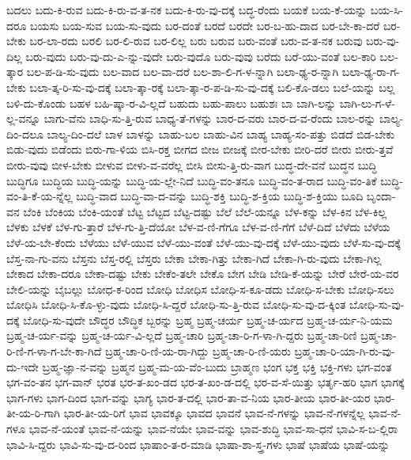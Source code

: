 {ಬದಲು
ಬದು-ಕಿ-ರುವ
ಬದು-ಕಿ-ರು-ವ-ತ-ನಕ
ಬದು-ಕಿ-ರು-ವು-ದಕ್ಕೆ
ಬದ್ಧ-ರೆಂದು
ಬಯಕೆ
ಬಯ-ಕೆ-ಯನ್ನು
ಬಯ-ಸಿ-ದರೂ
ಬಯಸು
ಬಯ-ಸುವ
ಬಯ-ಸು-ವುದು
ಬರ-ದಂತೆ
ಬರದೆ
ಬರದೇ
ಬರ-ಬ-ಹು-ದಾದ
ಬರ-ಬೇ-ಕಾ-ದರೆ
ಬರ-ಬೇಕು
ಬರ-ಲಾ-ರದು
ಬರಲಿ
ಬರ-ಲಿ-ರುವ
ಬರ-ಲಿಲ್ಲ
ಬರು
ಬರುವ
ಬರು-ವಂತೆ
ಬರು-ವ-ತ-ನಕ
ಬರುವು
ಬರು-ವು-ದಿಲ್ಲ
ಬರು-ವುದು
ಬರು-ವು-ದು-ಎ-ನ್ನು-ವುದೇ
ಬರು-ವುದೊ
ಬರು-ವುವು
ಬರೆದು
ಬರೆ-ಯು-ವಂತೆ
ಬಲ-ಕಾರಿ
ಬಲ-ತ್ಕಾರ
ಬಲ-ಪ-ಡಿ-ಸು-ವುದು
ಬಲ-ವಾದ
ಬಲ-ವಾ-ದರೆ
ಬಲ-ಶಾ-ಲಿ-ಗ-ಳ-ನ್ನಾಗಿ
ಬಲಾ-ಢ್ಯ-ರ-ನ್ನಾಗಿ
ಬಲಾ-ಢ್ಯ-ರಾ-ಗ-ಬೇಕು
ಬಲಾ-ತ್ಕ-ರಿ-ಸು-ವು-ದಕ್ಕೆ
ಬಲಾ-ತ್ಕಾ-ರಕ್ಕೆ
ಬಲಾ-ತ್ಕಾ-ರ-ಪ-ಡಿ-ಸು-ವು-ದಕ್ಕೆ
ಬಲಿ-ಕೊ-ಡಲು
ಬಲೆ-ಯನ್ನು
ಬಲ್ಲ
ಬಳಿ-ದು-ಕೊಂಡು
ಬಹಳ
ಬಹಿ-ಷ್ಕಾ-ರ-ವಿ-ಲ್ಲದೆ
ಬಹುದು
ಬಹು-ಪಾಲು
ಬಹುಶಃ
ಬಾ
ಬಾಗಿ-ಲನ್ನು
ಬಾಗಿ-ಲು-ಗ-ಳೆ-ಲ್ಲ-ವನ್ನೂ
ಬಾಗು-ವೆನು
ಬಾಧಿ-ಸು-ತ್ತಿ-ರುವ
ಬಾಧ್ಯ-ತೆ-ಗಳನ್ನು
ಬಾರ-ದ-ವರು
ಬಾರ-ದ-ವ-ರೆಂದು
ಬಾಲ-ರನ್ನು
ಬಾಲ್ಯ-ದಿಂ-ದಲೂ
ಬಾಲ್ಯ-ದಿಂ-ದಲೆ
ಬಾಳ
ಬಾಳನ್ನು
ಬಾಹು-ಬಲ
ಬಾಹು-ವಿನ
ಬಾಹ್ಯ
ಬಾಹ್ಯ-ಸಂ-ಪತ್ತು
ಬಿಡದೆ
ಬಿಡ-ಬೇಕು
ಬಿಡು-ವುದು
ಬಿಡೆಂದು
ಬಿರು-ಗಾ-ಳಿಯ
ಬಿಸಿ-ರಕ್ತ
ಬೀಗದ
ಬೀಜ
ಬೀಜಕ್ಕೆ
ಬೀರ-ಬೇಕು
ಬೀರಿ-ದರೆ
ಬೀರು
ಬೀರು-ತ್ತವೆ
ಬೀರು-ವುವು
ಬೀಳ-ಬೇಕು
ಬೀಳುವ
ಬೀಳು-ವ-ವರೆಲ್ಲ
ಬೀಸಿ
ಬೀಸು-ತ್ತಿ-ರು-ವಾಗ
ಬುದ್ಧ-ದೇ-ವನೆ
ಬುದ್ಧನ
ಬುದ್ಧಿ
ಬುದ್ಧಿಗೂ
ಬುದ್ಧಿಯ
ಬುದ್ಧಿ-ಯನ್ನು
ಬುದ್ಧಿ-ಯ-ಲ್ಲೇ-ನಿದೆ
ಬುದ್ಧಿ-ವಂ-ತನೂ
ಬುದ್ಧಿ-ವಂ-ತ-ರಾದ
ಬುದ್ಧಿ-ವಂ-ತಿಕೆ
ಬುದ್ಧಿ-ವಂ-ತಿ-ಕೆ-ಯ-ನ್ನೆಲ್ಲ
ಬುದ್ಧಿ-ವಾದ
ಬುದ್ಧಿ-ವಾ-ದ-ವನ್ನು
ಬುದ್ಧಿ-ಶಕ್ತಿ
ಬುದ್ಧಿ-ಶ-ಕ್ತಿಯ
ಬುದ್ಧಿ-ಶ-ಕ್ತಿಯು
ಬೂದಿ
ಬೃಂದಾ-ವನ
ಬೆಂಕಿ
ಬೆಂಕಿಯ
ಬೆಂಕಿ-ಯಂತೆ
ಬೆಟ್ಟ
ಬೆಟ್ಟದ
ಬೆಟ್ಟ-ದಷ್ಟು
ಬೆಲೆ
ಬೆಲೆ-ಯನ್ನೂ
ಬೆಳ-ಕನ್ನು
ಬೆಳ-ಕಿನ
ಬೆಳ-ಕಿಲ್ಲ
ಬೆಳಕು
ಬೆಳಕೆ
ಬೆಳ-ಗು-ತ್ತಾರೆ
ಬೆಳ-ಗು-ತ್ತಿ-ದೆಯೋ
ಬೆಳ-ವ-ಣಿ-ಗೆಗೂ
ಬೆಳ-ವ-ಣಿ-ಗೆಗೆ
ಬೆಳೆ-ದಿದೆ
ಬೆಳೆದು
ಬೆಳೆಯ
ಬೆಳೆ-ಯ-ಬೇ-ಕೆಂದು
ಬೆಳೆಯು
ಬೆಳೆ-ಯುವ
ಬೆಳೆ-ಯು-ವಂತೆ
ಬೆಳೆ-ಯು-ವು-ದಕ್ಕೆ
ಬೆಳೆ-ಯು-ವುದು
ಬೆಳೆ-ಸು-ವು-ದಕ್ಕೆ
ಬೆಸ್ತ-ನಾ-ಗು-ವನು
ಬೆಸ್ತನು
ಬೆಸ್ತ-ರಲ್ಲಿ
ಬೆಸ್ತರು
ಬೇಕಾ
ಬೇಕಾ-ಗಿತ್ತು
ಬೇಕಾ-ಗಿದೆ
ಬೇಕಾ-ಗಿ-ರು-ವುದು
ಬೇಕಾ-ಗಿಲ್ಲ
ಬೇಕಾದ
ಬೇಕಾ-ದರೂ
ಬೇಕಾ-ದಷ್ಟು
ಬೇಕು
ಬೇಕೆಂ-ತಲೇ
ಬೇಕೊ
ಬೇಗ
ಬೇಡಿ
ಬೇಡಿ-ಕೆ-ಯನ್ನು
ಬೇರೆ
ಬೇರೆ-ಯ-ವರ
ಬೇಲಿ-ಯನ್ನು
ಬೈಬಲ್ಲು
ಬೋಧ-ಕ-ರಿಂದ
ಬೋಧಿ
ಬೋಧಿಸ
ಬೋಧಿ-ಸ-ಕೂ-ಡದು
ಬೋಧಿ-ಸ-ಬೇಕು
ಬೋಧಿ-ಸಲು
ಬೋಧಿಸಿ
ಬೋಧಿ-ಸಿ-ಕೊ-ಳ್ಳು-ವುದು
ಬೋಧಿ-ಸಿ-ದ್ದರೆ
ಬೋಧಿ-ಸು-ತ್ತಿ-ರುವ
ಬೋಧಿ-ಸು-ವು-ದ-ಕ್ಕಿಂತ
ಬೋಧಿ-ಸು-ವು-ದಕ್ಕೆ
ಬೋಧಿ-ಸು-ವುದೇ
ಬೌದ್ಧರ
ಬೌದ್ಧಿಕ
ಬ್ಬರನ್ನು
ಬ್ರಹ್ಮ
ಬ್ರಹ್ಮ-ಚರ್ಯ
ಬ್ರಹ್ಮ-ಚ-ರ್ಯದ
ಬ್ರಹ್ಮ-ಚ-ರ್ಯ-ನಿ-ಯಮ
ಬ್ರಹ್ಮ-ಚ-ರ್ಯ-ವನ್ನು
ಬ್ರಹ್ಮ-ಚ-ರ್ಯ-ವಿ-ಲ್ಲದೆ
ಬ್ರಹ್ಮ-ಚಾರಿ
ಬ್ರಹ್ಮ-ಚಾ-ರಿ-ಗ-ಳಾ-ಗಿ-ದ್ದರು
ಬ್ರಹ್ಮ-ಚಾ-ರಿಣಿ
ಬ್ರಹ್ಮ-ಚಾ-ರಿ-ಣಿ-ಗ-ಳಾ-ಗ-ಬೇ-ಕಾ-ಗಿದೆ
ಬ್ರಹ್ಮ-ಚಾ-ರಿ-ಣಿ-ಯ-ರಾ-ಗಿದ್ದು
ಬ್ರಹ್ಮ-ಚಾ-ರಿ-ಣಿ-ಯರು
ಬ್ರಹ್ಮ-ಚಾ-ರಿ-ಯಾ-ಗಿ-ರು-ವು-ದು-ಇದೇ
ಬ್ರಹ್ಮ-ಜ್ಞಾ-ನ-ವನ್ನು
ಬ್ರಹ್ಮನ
ಬ್ರಹ್ಮ-ಮ-ಯ-ವೆಂ-ಬುದು
ಬ್ರಾಹ್ಮಣ
ಭಂಗ
ಭಕ್ತ
ಭಕ್ತಿ
ಭಕ್ತಿ-ಗಳು
ಭಗ-ವಂತ
ಭಗ-ವಂ-ತನ
ಭಗ-ವಾನ್
ಭರತ
ಭರ-ತ-ಖಂ-ಡದ
ಭರ-ತ-ಖಂ-ಡ-ದಲ್ಲಿ
ಭರ-ವ-ಸೆ-ಯಿತ್ತು
ಭರ್ತೃ-ಹರಿ
ಭಾಗ
ಭಾಗಕ್ಕೆ
ಭಾಗ-ಗಳು
ಭಾಗ-ದಿಂದ
ಭಾಗ-ವನ್ನು
ಭಾಗ್ಯ
ಭಾರ-ತ-ದಲ್ಲಿ
ಭಾರ-ತಾ-ವ-ನಿಯ
ಭಾರ-ತೀಯ
ಭಾರ-ತೀ-ಯರ
ಭಾರ-ತೀ-ಯ-ರಿ-ಗಾಗಿ
ಭಾರ-ತೀ-ಯ-ರಿಗೆ
ಭಾವ
ಭಾವಕ್ಕೂ
ಭಾವದ
ಭಾವನೆ
ಭಾವ-ನೆ-ಗಳನ್ನು
ಭಾವ-ನೆ-ಗಳನ್ನೆಲ್ಲ
ಭಾವ-ನೆ-ಗಳೂ
ಭಾವ-ನೆ-ಯಂತೆ
ಭಾವ-ನೆ-ಯನ್ನು
ಭಾವ-ನೆಯೇ
ಭಾವ-ವನ್ನು
ಭಾವ-ಶುದ್ಧಿ
ಭಾವ-ಸಾ-ಧನೆ
ಭಾವಿ-ಸ-ಬ-ಲ್ಲಿರಾ
ಭಾವಿ-ಸಿ-ದ್ದರು
ಭಾವಿ-ಸು-ವು-ದ-ರಿಂದ
ಭಾಷಾಂ-ತ-ರ-ಮಾಡಿ
ಭಾಷಾ-ಶಾ-ಸ್ತ್ರ-ಗಳು
ಭಾಷೆ
ಭಾಷೆಯ
ಭಾಷೆ-ಯನ್ನು
}
